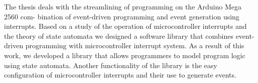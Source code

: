 
The thesis deals with the streamlining of programming on the Arduino Mega 2560 com-
bination of event-driven programming and event generation using interrupts.
Based on a study of the operation of microcontroller interrupts and the theory of state automata
we designed a software library that combines event-driven programming with
microcontroller interrupt system. As a result of this work, we developed a library that
allows programmers to model program logic using state automata.
Another functionality of the library is the easy configuration of microcontroller interrupts and their use
to generate events.